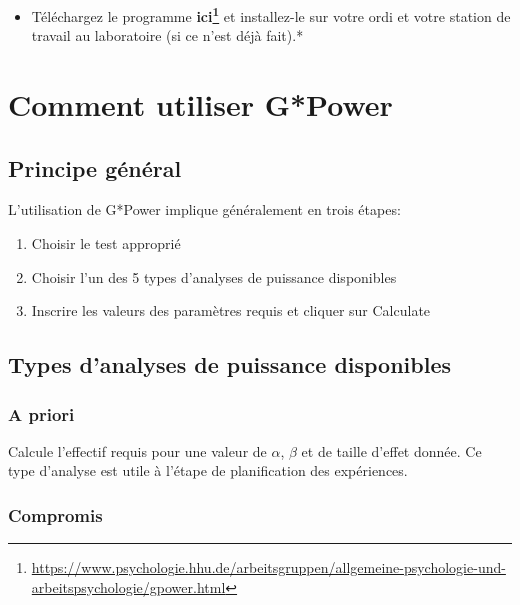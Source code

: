\documentclass[12pt,]{book}
\providecommand{\tightlist}{%
  \setlength{\itemsep}{0pt}\setlength{\parskip}{0pt}}
\renewcommand{\href}[2]{#2\footnote{\url{#1}}}
\begin{document}
\begin{itemize}
\tightlist
\item
  Téléchargez le programme \textbf{\href{https://www.psychologie.hhu.de/arbeitsgruppen/allgemeine-psychologie-und-arbeitspsychologie/gpower.html}{ici}} et installez-le sur votre ordi et votre station de travail au laboratoire (si ce n'est déjà fait).*
\end{itemize}

\hypertarget{comment-utiliser-gpower}{%
\section{Comment utiliser G*Power}\label{comment-utiliser-gpower}}

\hypertarget{principe-guxe9nuxe9ral}{%
\subsection{Principe général}\label{principe-guxe9nuxe9ral}}

L'utilisation de G*Power implique généralement en trois étapes:

\begin{enumerate}
\def\labelenumi{\arabic{enumi}.}
\tightlist
\item
  Choisir le test approprié
\item
  Choisir l'un des 5 types d'analyses de puissance disponibles
\item
  Inscrire les valeurs des paramètres requis et cliquer sur Calculate
\end{enumerate}

\hypertarget{types-danalyses-de-puissance-disponibles}{%
\subsection{Types d'analyses de puissance disponibles}\label{types-danalyses-de-puissance-disponibles}}

\hypertarget{a-priori}{%
\subsubsection*{A priori}\label{a-priori}}


Calcule l'effectif requis pour une valeur de \(\alpha\), \(\beta\) et de taille d'effet donnée.
Ce type d'analyse est utile à l'étape de planification des expériences.

\hypertarget{compromis}{%
\subsubsection*{Compromis}\label{compromis}}
\end{document}
